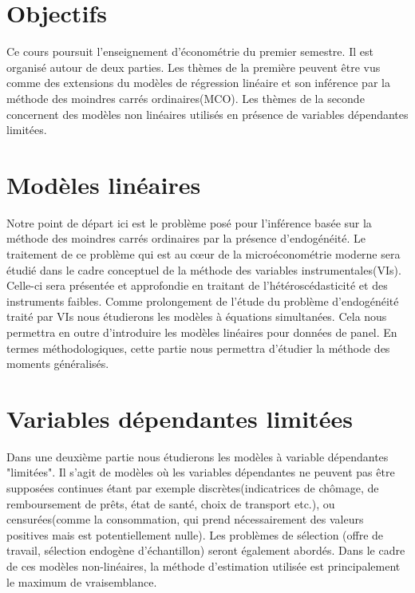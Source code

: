 \newpage

\tableofcontents

\newpage

\section{Objectifs}
Ce cours poursuit l'enseignement d'économétrie du premier semestre. Il est organisé autour de deux parties. 
Les thèmes de la première peuvent être vus comme des extensions du modèles de régression linéaire 
et son inférence par la méthode des moindres carrés ordinaires(MCO). Les thèmes de la seconde concernent 
des modèles non linéaires utilisés en présence de variables dépendantes limitées.

\section{Modèles linéaires}
Notre point de départ ici est le problème posé pour l'inférence 
basée sur la méthode des moindres carrés ordinaires par la présence d'endogénéité. 
Le traitement de ce problème qui est au cœur de la microéconométrie moderne sera étudié 
dans le cadre conceptuel de la méthode des variables instrumentales(VIs). 
Celle-ci sera présentée et approfondie en traitant de l'hétéroscédasticité et des instruments faibles. 
Comme prolongement de l'étude du problème d'endogénéité traité par VIs nous étudierons les modèles à équations simultanées.
Cela nous permettra en outre d'introduire les modèles linéaires pour données de panel. 
En termes méthodologiques, cette partie nous permettra d'étudier la méthode des moments généralisés.


\section{Variables dépendantes limitées}
 
 Dans une deuxième partie nous étudierons les modèles à variable dépendantes "limitées". Il s'agit de modèles 
 où les variables dépendantes ne peuvent pas être supposées continues étant par exemple discrètes(indicatrices de chômage, de remboursement de prêts, état de santé, choix de transport etc.),
 ou censurées(comme la consommation, qui prend nécessairement des valeurs positives mais est potentiellement nulle). 
 Les problèmes de sélection (offre de travail, sélection endogène d'échantillon) seront également abordés. 
 Dans le cadre de ces modèles non-linéaires, la méthode d'estimation utilisée est principalement 
 le maximum de vraisemblance.

